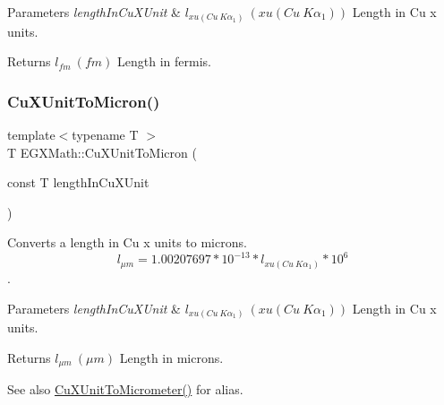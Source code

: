 \begin{DoxyParams}{Parameters}
{\em length\+In\+Cu\+X\+Unit} & $ l_{xu(Cu\ K\alpha_1)}\ (xu(Cu\ K\alpha_1))$ Length in Cu x units. \\
\hline
\end{DoxyParams}
\begin{DoxyReturn}{Returns}
$ l_{fm}\ (fm)$ Length in fermis. 
\end{DoxyReturn}
\mbox{\label{group___e_g_x_math-_conversions-_length_conversions-_non-_s_i-_cu_x_unit-_non-_s_i_ga382a9cae8bb23cf8d54777f5ccbff90b}} 
\subsubsection{\texorpdfstring{Cu\+X\+Unit\+To\+Micron()}{CuXUnitToMicron()}}
{\footnotesize\ttfamily template$<$typename T $>$ \\
T E\+G\+X\+Math\+::\+Cu\+X\+Unit\+To\+Micron (\begin{DoxyParamCaption}\item[{const T}]{length\+In\+Cu\+X\+Unit }\end{DoxyParamCaption})}



Converts a length in Cu x units to microns. \[ l_{\mu m}=1.00207697*10^{-13} * l_{xu(Cu\ K\alpha_1)} * 10^{6} \]. 


\begin{DoxyParams}{Parameters}
{\em length\+In\+Cu\+X\+Unit} & $ l_{xu(Cu\ K\alpha_1)}\ (xu(Cu\ K\alpha_1))$ Length in Cu x units. \\
\hline
\end{DoxyParams}
\begin{DoxyReturn}{Returns}
$ l_{\mu m}\ (\mu m)$ Length in microns. 
\end{DoxyReturn}
\begin{DoxySeeAlso}{See also}
\mbox{\hyperlink{group___e_g_x_math-_conversions-_length_conversions-_non-_s_i-_cu_x_unit-_s_i_gaff5d323918d6135f9e7643a5c6a17414}{Cu\+X\+Unit\+To\+Micrometer()}} for alias. 
\end{DoxySeeAlso}
\mbox{\label{group___e_g_x_math-_conversions-_length_conversions-_non-_s_i-_cu_x_unit-_non-_s_i_gad93f4b59cc8e8f052b3cf8cad7c7b173}} 
